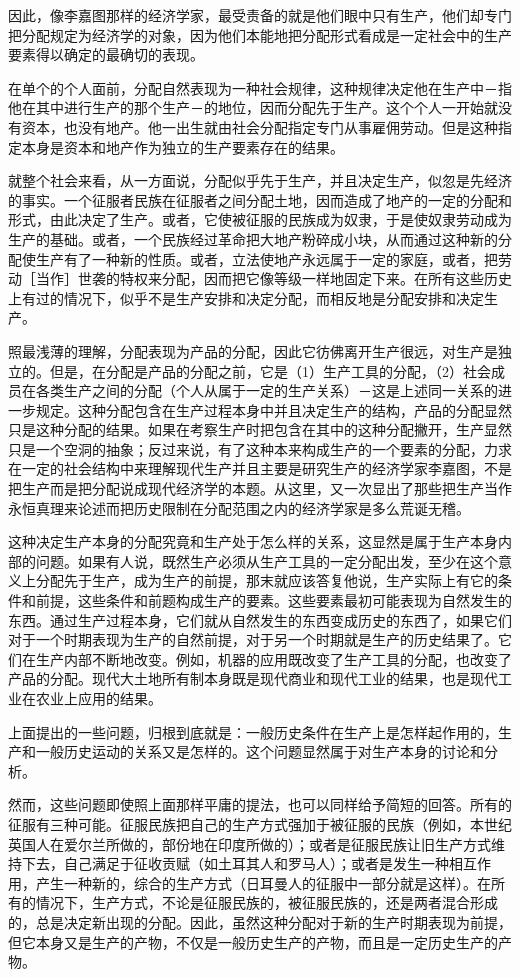 \documentclass[a4paper,twoside,12pt]{ctexart}
\begin{document}
因此，像李嘉图那样的经济学家，最受责备的就是他们眼中只有生产，他们却专门把分配规定为经济学的对象，因为他们本能地把分配形式看成是一定社会中的生产要素得以确定的最确切的表现。

在单个的个人面前，分配自然表现为一种社会规律，这种规律决定他在生产中－指他在其中进行生产的那个生产－的地位，因而分配先于生产。这个个人一开始就没有资本，也没有地产。他一出生就由社会分配指定专门从事雇佣劳动。但是这种指定本身是资本和地产作为独立的生产要素存在的结果。

就整个社会来看，从一方面说，分配似乎先于生产，并且决定生产，似忽是先经济的事实。一个征服者民族在征服者之间分配土地，因而造成了地产的一定的分配和形式，由此决定了生产。或者，它使被征服的民族成为奴隶，于是使奴隶劳动成为生产的基础。或者，一个民族经过革命把大地产粉碎成小块，从而通过这种新的分配使生产有了一种新的性质。或者，立法使地产永远属于一定的家庭，或者，把劳动［当作］世袭的特权来分配，因而把它像等级一样地固定下来。在所有这些历史上有过的情况下，似乎不是生产安排和决定分配，而相反地是分配安排和决定生产。

照最浅薄的理解，分配表现为产品的分配，因此它彷佛离开生产很远，对生产是独立的。但是，在分配是产品的分配之前，它是（1）生产工具的分配，（2）社会成员在各类生产之间的分配（个人从属于一定的生产关系）－这是上述同一关系的进一步规定。这种分配包含在生产过程本身中并且决定生产的结构，产品的分配显然只是这种分配的结果。如果在考察生产时把包含在其中的这种分配撇开，生产显然只是一个空洞的抽象；反过来说，有了这种本来构成生产的一个要素的分配，力求在一定的社会结构中来理解现代生产并且主要是研究生产的经济学家李嘉图，不是把生产而是把分配说成现代经济学的本题。从这里，又一次显出了那些把生产当作永恒真理来论述而把历史限制在分配范围之内的经济学家是多么荒诞无稽。

这种决定生产本身的分配究竟和生产处于怎么样的关系，这显然是属于生产本身内部的问题。如果有人说，既然生产必须从生产工具的一定分配出发，至少在这个意义上分配先于生产，成为生产的前提，那末就应该答复他说，生产实际上有它的条件和前提，这些条件和前题构成生产的要素。这些要素最初可能表现为自然发生的东西。通过生产过程本身，它们就从自然发生的东西变成历史的东西了，如果它们对于一个时期表现为生产的自然前提，对于另一个时期就是生产的历史结果了。它们在生产内部不断地改变。例如，机器的应用既改变了生产工具的分配，也改变了产品的分配。现代大土地所有制本身既是现代商业和现代工业的结果，也是现代工业在农业上应用的结果。

上面提出的一些问题，归根到底就是：一般历史条件在生产上是怎样起作用的，生产和一般历史运动的关系又是怎样的。这个问题显然属于对生产本身的讨论和分析。

然而，这些问题即使照上面那样平庸的提法，也可以同样给予简短的回答。所有的征服有三种可能。征服民族把自己的生产方式强加于被征服的民族（例如，本世纪英国人在爱尔兰所做的，部份地在印度所做的）；或者是征服民族让旧生产方式维持下去，自己满足于征收贡赋（如土耳其人和罗马人）；或者是发生一种相互作用，产生一种新的，综合的生产方式（日耳曼人的征服中一部分就是这样）。在所有的情况下，生产方式，不论是征服民族的，被征服民族的，还是两者混合形成的，总是决定新出现的分配。因此，虽然这种分配对于新的生产时期表现为前提，但它本身又是生产的产物，不仅是一般历史生产的产物，而且是一定历史生产的产物。
\end{document}
